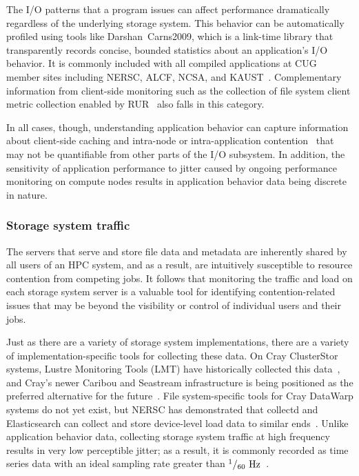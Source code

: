 The I/O patterns that a program issues can affect performance dramatically regardless of the underlying storage system.
This behavior can be automatically profiled using tools like Darshan~{Carns2009}, which is a link-time library that transparently records concise, bounded statistics about an application's I/O behavior.  
It is commonly included with all compiled applications at CUG member sites including NERSC, ALCF, NCSA, and KAUST~\cite{Lockwood2017,Luu:2015:HPDC,Hadri2015,White2017}.
Complementary information from client-side monitoring  such as the collection of file system client metric collection enabled by RUR~\cite{Butler2014} also falls in this category.

In all cases, though, understanding application behavior can capture information about client-side caching and intra-node or intra-application contention~\cite{Lofstead2010} that may not be quantifiable from other parts of the I/O subsystem.
In addition, the sensitivity of application performance to jitter caused by ongoing performance monitoring on compute nodes results in application behavior data being discrete in nature.

\subsubsection{Storage system traffic} \label{sec:architecture/components/fs}

The servers that serve and store file data and metadata are inherently shared by all users of an HPC system, and as a result, are intuitively susceptible to resource contention from competing jobs.
It follows that monitoring the traffic and load on each storage system server is a valuable tool for identifying contention-related issues that may be beyond the visibility or control of individual users and their jobs.

Just as there are a variety of storage system implementations, there are a variety of implementation-specific tools for collecting these data.
On Cray ClusterStor systems, Lustre Monitoring Tools (LMT) have historically collected this data~\cite{Keopp2014}, and Cray's newer Caribou and Seastream infrastructure is being positioned as the preferred alternative for the future~\cite{Flaskerud2017}.
File system-specific tools for Cray DataWarp systems do not yet exist, but NERSC has demonstrated that collectd and Elasticsearch can collect and store device-level load data to similar ends~\cite{Whitney2016}.
Unlike application behavior data, collecting storage system traffic at high frequency results in very low perceptible jitter; as a result, it is commonly recorded as time series data with an ideal sampling rate greater than ${{^1 / _{60} \textup{ Hz}}}$~\cite{Madireddy2017}.

